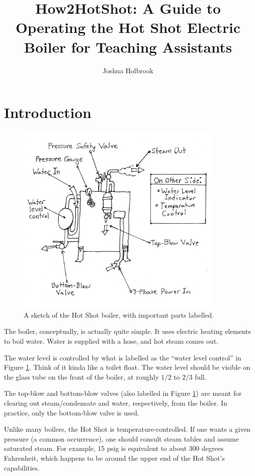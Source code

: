\documentclass[12pt, letterpaper]{article}
\title{How2HotShot: A Guide to Operating the Hot Shot Electric Boiler for Teaching Assistants}
\author{Joshua Holbrook}
\begin{document}
\maketitle

\section{Introduction}

\begin{figure}
\label{fig:boiler}
\includegraphics[width=0.9\textwidth]{boiler}
\caption{A sketch of the Hot Shot boiler, with important parts labelled.}
\end{figure}

The boiler, conceptually, is actually quite simple. It uses electric heating elements to boil water. Water is supplied with a hose, and hot steam comes out.

The water level is controlled by what is labelled as the ``water level control'' in Figure \ref{fig:boiler}. Think of it kinda like a toilet float. The water level should be visible on the glass tube on the front of the boiler, at roughly \(1/2\) to \(2/3\) full.

The top-blow and bottom-blow valves (also labelled in Figure \ref{fig:boiler}) are meant for clearing out steam/condensate and water, respectively, from the boiler. In practice, only the bottom-blow valve is used.

Unlike many boilers, the Hot Shot is temperature-controlled. If one wants a given pressure (a common occurrence), one should consult steam tables and assume saturated steam. For example, 15 psig is equivalent to about 300 degrees Fahrenheit, which happens to be around the upper end of the Hot Shot's capabilities.
\end{document}
